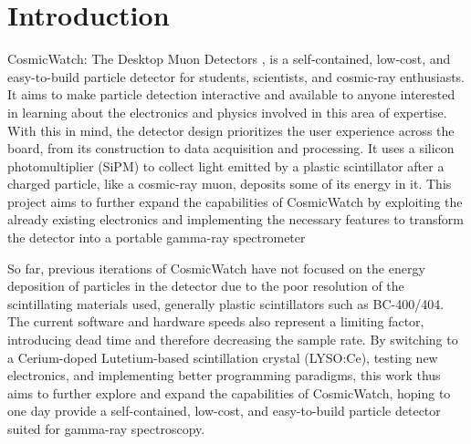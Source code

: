 \chapter{Introduction}

CosmicWatch: The Desktop Muon Detectors \cite{axani2019physics}, is a self-contained, low-cost, and easy-to-build particle detector for students, scientists, and cosmic-ray enthusiasts. It aims to make particle detection interactive and available to anyone interested in learning about the electronics and physics involved in this area of expertise. With this in mind, the detector design prioritizes the user experience across the board, from its construction to data acquisition and processing. It uses a silicon photomultiplier (SiPM) to collect light emitted by a plastic scintillator after a charged particle, like a cosmic-ray muon, deposits some of its energy in it. This project aims to further expand the capabilities of CosmicWatch by exploiting the already existing electronics and implementing the necessary features to transform the detector into a portable gamma-ray spectrometer

So far, previous iterations of CosmicWatch have not focused on the energy deposition of particles in the detector due to the poor resolution of the scintillating materials used, generally plastic scintillators such as BC-400/404. The current software and hardware speeds also represent a limiting factor, introducing dead time and therefore decreasing the sample rate. By switching to a Cerium-doped Lutetium-based scintillation crystal (LYSO:Ce), testing new electronics, and implementing better programming paradigms, this work thus aims to further explore and expand the capabilities of CosmicWatch, hoping to one day provide a self-contained, low-cost, and easy-to-build particle detector suited for gamma-ray spectroscopy.